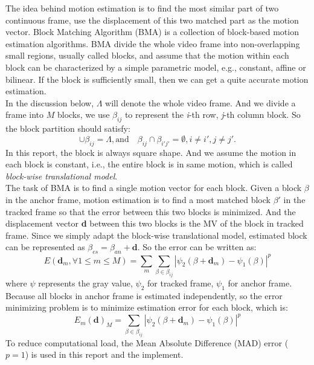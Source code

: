 \documentclass[a4paper, twocolumn]{article}
\begin{document}
	\noindent	
	The idea behind motion estimation is to find the most similar part of two continuous frame, use the displacement of this two matched part as the motion vector.  Block Matching Algorithm (BMA) is a collection of block-based motion estimation algorithms.  BMA divide the whole video frame into non-overlapping small regions, usually called blocks, and assume that the motion within each block can be characterized by a simple parametric model, e.g., constant, affine or bilinear. If the block is sufficiently small, then we can get a quite accurate motion estimation. \\
	In the discussion below, $\Lambda$ will denote the whole video frame. And we divide a frame into $ M $ blocks, we use $ \beta_{ij} $ to represent the \textit{i}-th row, \textit{j}-th column block. So the block partition should satisfy: 
	\begin{displaymath}
		\cup  \beta_{ij} = \Lambda, \textrm{and} \quad \beta_{ij}  \cap \beta_{i'j'} = \emptyset, i \ne i', j \ne j' .
	\end{displaymath}
	In this report, the block is always square shape. And we assume the motion in each block is constant, i.e., the entire block is in same motion, which is called \textit{block-wise translational model}. \\
	The task of BMA is to find a single motion vector for each block. Given a block $ \beta $ in the anchor frame, motion estimation is to find a most matched block $ \beta' $ in the tracked frame so that the error between this two blocks is minimized. And the displacement vector \textbf{d} between this two blocks is the MV of the block in tracked frame. Since we simply adapt the block-wise translational model, estimated block can be represented as $ \beta_{es} = \beta_{an} + \textbf{d} $. So the error can be written as: 
	\begin{displaymath}
		\textit{E}(\textbf{d}_{m}, \forall 1 \leq m \leq M) = \sum_{m} \sum_{\beta \in \beta_{ij}} 
		| \psi_{2}(\beta + \textbf{d}_{m}) - \psi_{1}(\beta) | ^ {p}
	\end{displaymath}
	where $ \psi $ represents the gray value, $ \psi_{2} $ for tracked frame, $ \psi_{1} $ for anchor frame.\\
	Because all blocks in anchor frame is estimated independently, so the error minimizing problem is to minimize estimation error for each block, which is: 
	\begin{equation}
		\label{eq:error}
		\textit{E}_{m}(\textbf{d})_{M} = \sum_{\beta \in \beta_{ij}} | \psi_{2}(\beta + \textbf{d}_{m}) - \psi_{1}(\beta) | ^{p}
	\end{equation}
	To reduce computational load, the Mean Absolute Difference (MAD) error ( $ p = 1 $) is used in this report and the implement.
\end{document}
